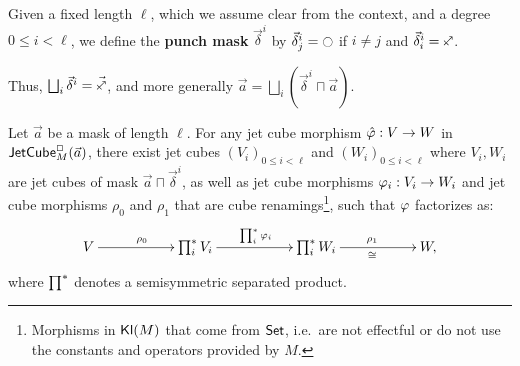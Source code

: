 \documentclass[a4paper]{memoir}
\begin{document}
\begin{definition}
	Given a fixed length $\ell$, which we assume clear from the context, and a degree $0 \leq i < \ell$, we define the \textbf{punch mask} $\vec \delta^i$ by $\vec \delta^i_j = \npolar$ if $i \neq j$ and $\vec \delta^i_i = \ypolar$.
\end{definition}
Thus, $\bigsqcup_i \vec \delta^i = \vec{\ypolar}$, and more generally $\vec a = \bigsqcup_i (\vec \delta^i \sqcap \vec a)$.
\begin{theorem} \label{sssfactorization}
	Let $\vec a$ be a mask of length $\ell$.
	For any jet cube morphism $\hat {\varphi} : V \to W$ in $\mathsf{JetCube}^{\Box}_{M}\mathopen{}\left( \vec a \right)\mathclose{}$, there exist jet cubes $(V_i)_{0 \leq i < \ell}$ and $(W_i)_{0 \leq i < \ell}$ where $V_i, W_i$ are jet cubes of mask $\vec a \sqcap \vec \delta^i$, as well as jet cube morphisms $\varphi_i : V_i \to W_i$ and jet cube morphisms $\rho_0$ and $\rho_1$ that are cube renamings\footnote{Morphisms in ${\mathsf{Kl}}(M)$ that come from ${\mathsf{Set}}$, i.e.\ are not effectful or do not use the constants and operators provided by $M$.}, such that $\varphi$ factorizes as:
	\[
		\xymatrix{
			V
				\ar[rr]^{\rho_0}
			&& {\bigasterisk_i V_i}
				\ar[rr]^{\bigasterisk_i \vfi_i}
			&& {\bigasterisk_i W_i}
				\ar[rr]^{\rho_1}_\cong
			&& W,
		}
	\]
	where $\prod^{*}$ denotes a semisymmetric separated product.
\end{theorem}
\end{document}
